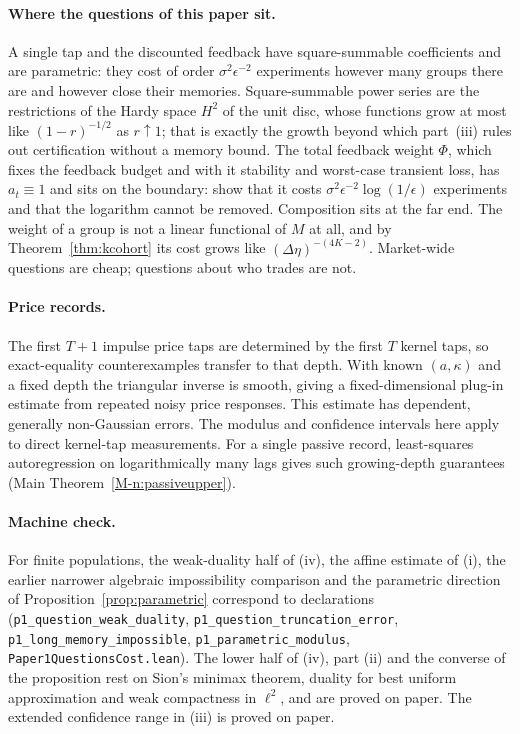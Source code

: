 \documentclass[12pt]{article}
\theoremstyle{definition}
\theoremstyle{remark}
\begin{document}
\paragraph{Where the questions of this paper sit.} A single tap and the discounted feedback have square-summable coefficients and are parametric: they cost of order $\sigma^2\epsilon^{-2}$ experiments however many groups there are and however close their memories. Square-summable power series are the restrictions of the Hardy space $H^2$ of the unit disc, whose functions grow at most like $(1-r)^{-1/2}$ as $r\uparrow1$; that is exactly the growth beyond which part~(iii) rules out certification without a memory bound. The total feedback weight $\Phi$, which fixes the feedback budget and with it stability and worst-case transient loss, has $a_t\equiv1$ and sits on the boundary: \citet{niroula2026b} show that it costs $\sigma^2\epsilon^{-2}\log(1/\epsilon)$ experiments and that the logarithm cannot be removed. Composition sits at the far end. The weight of a group is not a linear functional of $M$ at all, and by Theorem~\ref{thm:kcohort} its cost grows like $(\Delta\eta)^{-(4K-2)}$. Market-wide questions are cheap; questions about who trades are not.

\paragraph{Price records.} The first $T+1$ impulse price taps are determined by the first $T$ kernel taps, so exact-equality counterexamples transfer to that depth. With known $(a,\kappa)$ and a fixed depth the triangular inverse is smooth, giving a fixed-dimensional plug-in estimate from repeated noisy price responses. This estimate has dependent, generally non-Gaussian errors. The modulus and confidence intervals here apply to direct kernel-tap measurements. For a single passive record, least-squares autoregression on logarithmically many lags gives such growing-depth guarantees (Main Theorem~\ref{M-n:passiveupper}).

\paragraph{Machine check.} For finite populations, the weak-duality half of (iv), the affine estimate of (i), the earlier narrower algebraic impossibility comparison and the parametric direction of Proposition~\ref{prop:parametric} correspond to declarations (\texttt{p1\_question\_weak\_duality}, \texttt{p1\_question\_truncation\_error}, \texttt{p1\_long\_memory\_impossible}, \texttt{p1\_parametric\_modulus}, \nolinkurl{Paper1QuestionsCost.lean}). The lower half of (iv), part (ii) and the converse of the proposition rest on Sion's minimax theorem, duality for best uniform approximation and weak compactness in $\ell^2$, and are proved on paper. The extended confidence range in (iii) is proved on paper.
\end{document}
